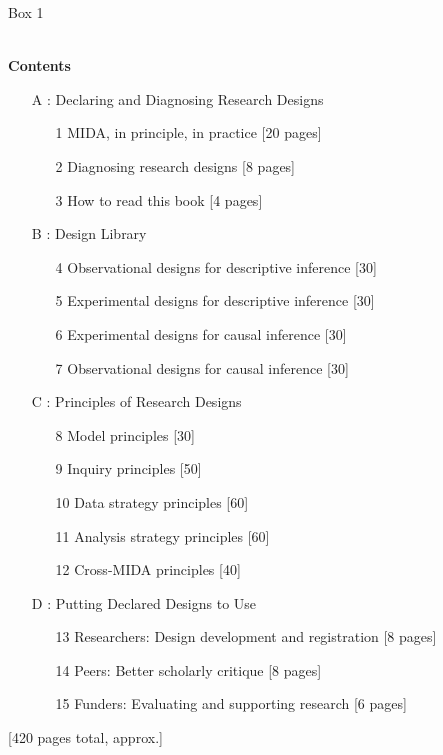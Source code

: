 \documentclass[11pt]{article}
\begin{document}
\begin{framed}
\begin{centering} Box 1 \end{centering}\\

	\noindent\textbf{Contents}
	\begin{enumerate}
		\item[A]: Declaring and Diagnosing Research Designs
		
		\begin{enumerate}
			\item[1] MIDA, in principle, in practice [20 pages]
			\item[2] Diagnosing research designs [8 pages]
			\item[3] How to read this book [4 pages]
		\end{enumerate}
		
		\item[B]: Design Library
		\begin{enumerate}
			\item[4] Observational designs for descriptive inference [30]
			\item[5] Experimental designs for descriptive inference [30]
			\item[6] Experimental designs for causal inference [30]
			\item[7] Observational designs for causal inference [30]
		\end{enumerate}
		
		\item[C]: Principles of Research Designs
		\begin{enumerate}
			\item[8] Model principles [30]
			\item[9] Inquiry principles [50]
			\item[10] Data strategy principles [60]
			\item[11] Analysis strategy principles [60]
			\item[12] Cross-MIDA principles [40]
		\end{enumerate}
	\item[D]: Putting Declared Designs to Use
				\begin{enumerate}
					\item[13] Researchers: Design development and registration [8 pages]				
					\item[14]  Peers: Better scholarly critique [8 pages]
          \item[15]  Funders: Evaluating and supporting research [6 pages]   
				\end{enumerate}
				
	\end{enumerate}
	[420 pages total, approx.]
\end{framed}
\end{document}
